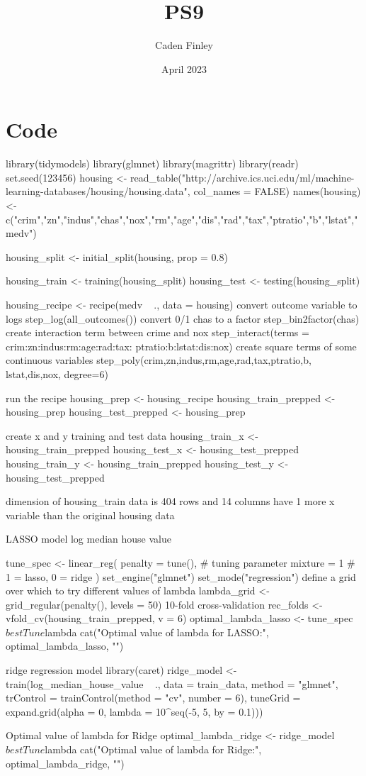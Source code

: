 \documentclass{article}
\title{PS9}
\author{Caden Finley}
\date{April 2023}
\begin{document}
\maketitle

\section{Code}

library(tidymodels)
library(glmnet)
library(magrittr)
library(readr)
set.seed(123456)
housing <- read_table("http://archive.ics.uci.edu/ml/machine-learning-databases/housing/housing.data", col_names = FALSE)
names(housing) <- c("crim","zn","indus","chas","nox","rm","age","dis","rad","tax","ptratio","b","lstat","medv")

housing_split <- initial_split(housing, prop = 0.8)

housing_train <- training(housing_split)
housing_test  <- testing(housing_split)

housing_recipe <- recipe(medv ~ ., data = housing) %
   convert outcome variable to logs
  step_log(all_outcomes()) %
   convert 0/1 chas to a factor
  step_bin2factor(chas) %
   create interaction term between crime and nox 
  step_interact(terms = ~ crim:zn:indus:rm:age:rad:tax:
  ptratio:b:lstat:dis:nox) %
   create square terms of some continuous variables
  step_poly(crim,zn,indus,rm,age,rad,tax,ptratio,b, lstat,dis,nox, degree=6)

 run the recipe
housing_prep <- housing_recipe %
housing_train_prepped <- housing_prep %
housing_test_prepped <- housing_prep %

 create x and y training and test data
housing_train_x <- housing_train_prepped %
housing_test_x <- housing_test_prepped %
housing_train_y <- housing_train_prepped %
housing_test_y <- housing_test_prepped %

 dimension of housing_train data is 404 rows and 14 columns
 have 1 more x variable than the original housing data

 LASSO model
 log median house value

tune_spec <- linear_reg(
  penalty = tune(), # tuning parameter
  mixture = 1       # 1 = lasso, 0 = ridge
) %
  set_engine("glmnet") %
  set_mode("regression")
 define a grid over which to try different values of lambda
lambda_grid <- grid_regular(penalty(), levels = 50)
 10-fold cross-validation
rec_folds <- vfold_cv(housing_train_prepped, v = 6)
optimal_lambda_lasso <- tune_spec$bestTune$lambda
cat("Optimal value of lambda for LASSO:", optimal_lambda_lasso, "\n")

 ridge regression model 
library(caret)
ridge_model <- train(log_median_house_value ~ ., data = train_data, method = "glmnet",
                     trControl = trainControl(method = "cv", number = 6),
                     tuneGrid = expand.grid(alpha = 0, lambda = 10^seq(-5, 5, by = 0.1)))

 Optimal value of lambda for Ridge
optimal_lambda_ridge <- ridge_model$bestTune$lambda
cat("Optimal value of lambda for Ridge:", optimal_lambda_ridge, "\n")
\end{document}
